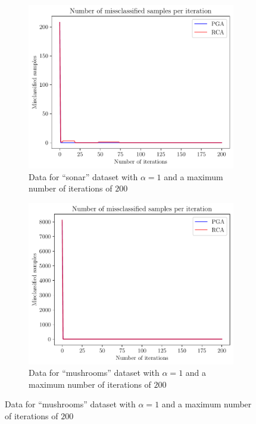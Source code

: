 \documentclass{article}
\begin{document}
\begin{itemize}
           \begin{figure}[h!]
                \centering
                \begin{subfigure}{0.45\textwidth}
                    \centering
                    \includegraphics[width=\linewidth]{../code/plots/tiny_miss_plot.pdf}
                    \caption{Data for ``sonar'' dataset with $\alpha = 1$ and
                    a maximum number of iterations of $200$}
                    \label{miss_sonar}
                \end{subfigure}
                \hfill
                \begin{subfigure}{0.45\textwidth}
                    \centering
                    \includegraphics[width=\linewidth]{../code/plots/small_miss_plot.pdf}
                    \caption{Data for ``mushrooms'' dataset with $\alpha = 1$ and
                    a maximum number of iterations of $200$}
                    \label{miss_mushrooms}
                \end{subfigure}
                \label{fig:pd}
           \end{figure}


\end{itemize}
\end{document}
